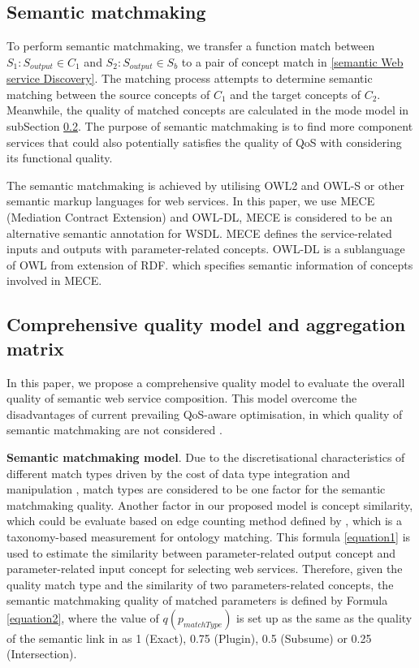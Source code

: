 \documentclass{llncs}
\begin{document}
\subsection{Semantic matchmaking} \label{semantic_matchmaking}
To perform semantic matchmaking, we transfer a function match between $S_{1}: S_{output} \in C_{1}$ and $S_{2}:S_{output} \in S_{b}$ to a pair of concept match in \ref{semantic Web service Discovery}. The matching process attempts to determine semantic matching between the source concepts of $C_{1}$ and the target concepts of $C_{2}$. Meanwhile, the quality of matched concepts are calculated in the mode model in subSection \ref{qualityModel}. The purpose of semantic matchmaking is to find more component services that could also potentially satisfies the quality of QoS with considering its functional quality.

The semantic matchmaking is achieved by utilising OWL2 and OWL-S or other semantic markup languages for web services. In this paper, we use MECE (Mediation Contract Extension) \cite{bleul2008self} and OWL-DL, MECE is considered to be an alternative semantic annotation for WSDL. MECE defines the service-related inputs and outputs with parameter-related concepts. OWL-DL is a sublanguage of OWL from extension of RDF. which specifies semantic information of concepts involved in MECE. 

\subsection{Comprehensive quality model and aggregation matrix}\label{qualityModel}
In this paper, we propose a comprehensive quality model to evaluate the overall quality of semantic web service composition. This model overcome the disadvantages of current prevailing QoS-aware optimisation, in which quality of semantic matchmaking are not considered \cite{bansal2016generalized,mier2015integrated,da2016particle,da2015graphevol,yu2013adaptive}.

\textbf{Semantic matchmaking model}. Due to the discretisational characteristics of different match types driven by the cost of  data type integration and manipulation \cite{lecue2009optimizing}, match types are considered to be one factor for the semantic matchmaking quality. Another factor in our proposed model is concept similarity, which could be evaluate based on edge counting method defined by \cite{shet2012new}, which is a taxonomy-based measurement for ontology matching. This formula \ref{equation1} is used to estimate the similarity between parameter-related output concept and parameter-related input concept for selecting web services. Therefore, given the quality match type and the similarity of two parameters-related concepts, the semantic matchmaking quality of matched parameters is defined by Formula \ref{equation2}, where the value of $q(p_ {matchType})$ is set up as the same as the quality of the semantic link in \cite{lecue2009optimizing} as 1 (Exact), 0.75 (Plugin), 0.5 (Subsume) or 0.25 (Intersection). 
\end{document}
